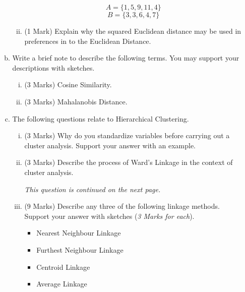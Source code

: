 \begin{enumerate}
\begin{enumerate}[(a)]
\begin{enumerate}[(i)]
	
		\[ A = \{1,5,9,11,4\}\]
		\[ B = \{3,3,6,4,7\}\]
		\item (1 Mark) Explain why the squared Euclidean distance may be used in preferences in to the Euclidean Distance.
	\end{enumerate}

\bigskip 
\item Write a brief note to describe the following terms. You may support your descriptions with sketches.
\begin{enumerate}[(i)]
\item (3 Marks) Cosine Similarity.
\item (3 Marks) Mahalanobis Distance. 
\end{enumerate}


\bigskip 
\item The following questions relate to Hierarchical Clustering.


\begin{enumerate}[(i)]
	
\item (3 Marks) Why do you standardize variables before carrying out a cluster analysis. Support your answer with an example.

\item (3 Marks) Describe the process of Ward's Linkage in the context of cluster analysis.


\noindent \textit{This question is continued on the next page.}
\newpage	
\item (9 Marks)  Describe any three of the following linkage methods. Support your answer with sketches (\textit{3 Marks for each}).
	\begin{itemize}
		\item Nearest Neighbour Linkage
		\item Furthest Neighbour Linkage
		\item Centroid Linkage
		\item Average Linkage
	\end{itemize}

	


\end{enumerate}
\end{enumerate}
\end{enumerate}
